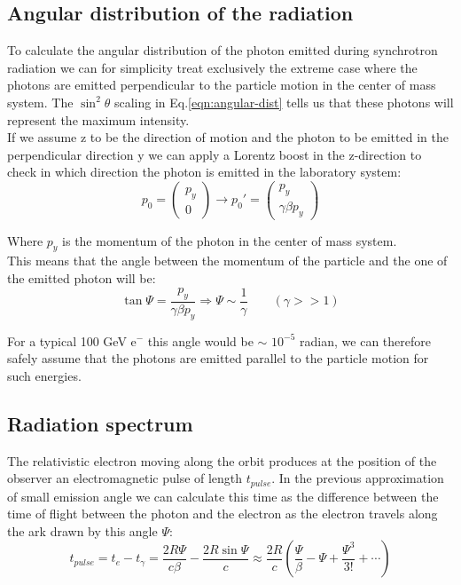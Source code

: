  \subsection{Angular distribution of the radiation}
 To calculate the angular distribution of the photon emitted during synchrotron radiation we can for simplicity treat exclusively the extreme case where the photons are emitted perpendicular to the particle motion in the center of mass system. The $\sin^2 \theta $ scaling in Eq.\ref{eqn:angular-dist} tells us that these photons will represent the maximum intensity.\\
 If we assume z to be the direction of motion and the photon to be emitted in the perpendicular direction y we can apply a Lorentz boost in the z-direction to check in which direction the photon is emitted in the laboratory system:
 \[
 p_0 = 
 \begin{pmatrix}
 p_y \\ 
 0
 \end{pmatrix}
\longrightarrow
p_0'=
\begin{pmatrix}
p_y \\
\gamma \beta p_y 
\end{pmatrix}  
 \]

Where $p_y$ is the momentum of the photon in the center of mass system. \\
This means that the angle between the momentum of the particle and the one of the emitted photon will be:
\begin{equation}
\tan \Psi = \frac{p_y}{\gamma \beta p_y} \Rightarrow \Psi \sim \frac{1}{\gamma} \qquad (\gamma >> 1)
\end{equation}

For a typical 100 GeV e$^-$ this angle would be $\sim$ $10^{-5}$ radian, we can therefore safely assume that the photons are emitted parallel to the particle motion for such energies.

\subsection{Radiation spectrum}
The relativistic electron moving  along the orbit produces  at the position of the observer an electromagnetic pulse of length $t_{pulse}$. In the previous approximation of small emission angle we can calculate this time as the difference between the time of flight between the photon and the electron as the electron travels along the ark drawn by this angle $\Psi$:
\[t_{pulse} = t_e - t_{\gamma} =  \frac{2R\Psi}{c \beta} - \frac{2 R \sin \Psi}{c}
\approx \frac{2R}{c}\left(\frac{\Psi}{\beta}-\Psi+\frac{\Psi^3}{3!}+\cdots\right)
\]

